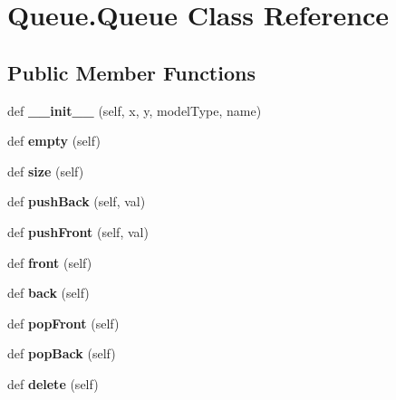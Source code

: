 \hypertarget{class_queue_1_1_queue}{}\section{Queue.\+Queue Class Reference}
\label{class_queue_1_1_queue}
\subsection*{Public Member Functions}
\begin{DoxyCompactItemize}
\item 
def {\bfseries \+\_\+\+\_\+init\+\_\+\+\_\+} (self, x, y, model\+Type, name)\hypertarget{class_queue_1_1_queue_a775357405d27ad4bdf5ed097bee49665}{}\label{class_queue_1_1_queue_a775357405d27ad4bdf5ed097bee49665}

\item 
def {\bfseries empty} (self)\hypertarget{class_queue_1_1_queue_a1472c6353f40c911d09da436ce8b2baa}{}\label{class_queue_1_1_queue_a1472c6353f40c911d09da436ce8b2baa}

\item 
def {\bfseries size} (self)\hypertarget{class_queue_1_1_queue_a478b93022acfd9225f15868f5eda0410}{}\label{class_queue_1_1_queue_a478b93022acfd9225f15868f5eda0410}

\item 
def {\bfseries push\+Back} (self, val)\hypertarget{class_queue_1_1_queue_a6333268eb174c6fda6f9574e951710b2}{}\label{class_queue_1_1_queue_a6333268eb174c6fda6f9574e951710b2}

\item 
def {\bfseries push\+Front} (self, val)\hypertarget{class_queue_1_1_queue_a17b55e82b5a8db529ff6a23a6b14bb03}{}\label{class_queue_1_1_queue_a17b55e82b5a8db529ff6a23a6b14bb03}

\item 
def {\bfseries front} (self)\hypertarget{class_queue_1_1_queue_a7d3ec12e83314c6a109e8403b9250c30}{}\label{class_queue_1_1_queue_a7d3ec12e83314c6a109e8403b9250c30}

\item 
def {\bfseries back} (self)\hypertarget{class_queue_1_1_queue_ab49a295f4ebc449e5830119085493614}{}\label{class_queue_1_1_queue_ab49a295f4ebc449e5830119085493614}

\item 
def {\bfseries pop\+Front} (self)\hypertarget{class_queue_1_1_queue_aa2cd3a51ee6600ca226f7c43623d6ede}{}\label{class_queue_1_1_queue_aa2cd3a51ee6600ca226f7c43623d6ede}

\item 
def {\bfseries pop\+Back} (self)\hypertarget{class_queue_1_1_queue_a192c71ff5839f8b1970976eefaaec777}{}\label{class_queue_1_1_queue_a192c71ff5839f8b1970976eefaaec777}

\item 
def {\bfseries delete} (self)\hypertarget{class_queue_1_1_queue_ac384b9efaf5e8d9b1b7a34183062468c}{}\label{class_queue_1_1_queue_ac384b9efaf5e8d9b1b7a34183062468c}

\end{DoxyCompactItemize}
